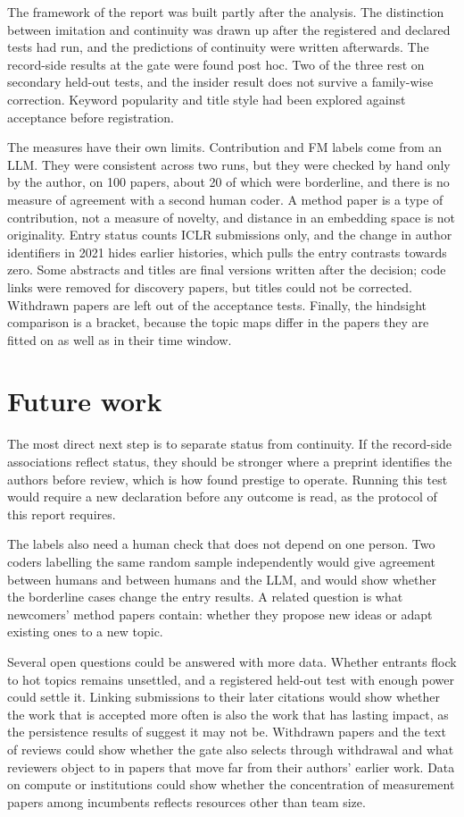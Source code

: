 The framework of the report was built partly after the analysis. The distinction between imitation and continuity was
drawn up after the registered and declared tests had run, and the predictions of continuity were written afterwards.
The record-side results at the gate were found post hoc. Two of the three rest on secondary held-out tests, and the
insider result does not survive a family-wise correction. Keyword popularity and title style had been explored against
acceptance before registration.

The measures have their own limits. Contribution and FM labels come from an LLM. They were consistent across two runs,
but they were checked by hand only by the author, on 100 papers, about 20 of which were borderline, and there is no
measure of agreement with a second human coder. A method paper is a type of contribution, not a measure of novelty, and
distance in an embedding space is not originality. Entry status counts ICLR submissions only, and the change in author
identifiers in 2021 hides earlier histories, which pulls the entry contrasts towards zero. Some abstracts and titles
are final versions written after the decision; code links were removed for discovery papers, but titles could not be
corrected. Withdrawn papers are left out of the acceptance tests. Finally, the hindsight comparison is a bracket,
because the topic maps differ in the papers they are fitted on as well as in their time window.

\section{Future work}
\label{sec:future}

The most direct next step is to separate status from continuity. If the record-side associations reflect status, they
should be stronger where a preprint identifies the authors before review, which is how \citet{ibrahim2026bias} found
prestige to operate. Running this test would require a new declaration before any outcome is read, as the protocol of
this report requires.

The labels also need a human check that does not depend on one person. Two coders labelling the same random sample
independently would give agreement between humans and between humans and the LLM, and would show whether the
borderline cases change the entry results. A related question is what newcomers' method papers contain: whether they
propose new ideas or adapt existing ones to a new topic.

Several open questions could be answered with more data. Whether entrants flock to hot topics remains unsettled, and a
registered held-out test with enough power could settle it. Linking submissions to their later citations would show
whether the work that is accepted more often is also the work that has lasting impact, as the persistence results of
\citet{bao2025persistence} suggest it may not be. Withdrawn papers and the text of reviews could show whether the gate
also selects through withdrawal and what reviewers object to in papers that move far from their authors' earlier work.
Data on compute or institutions could show whether the concentration of measurement papers among incumbents reflects
resources other than team size.

